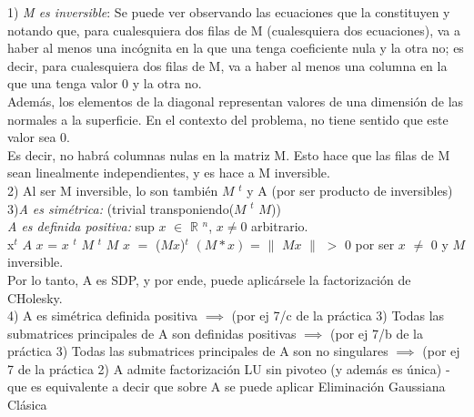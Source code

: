 1) \textit{M es inversible}: Se puede ver observando las ecuaciones que la constituyen y notando que, para cualesquiera dos filas de M (cualesquiera dos ecuaciones), va a haber al menos una incógnita en la que una tenga coeficiente nula y la otra no; es decir, para cualesquiera dos filas de M, va a haber al menos una columna en la que una tenga valor 0 y la otra no. \\
Además, los elementos de la diagonal representan valores de una dimensión de las normales a la superficie. En el contexto del problema, no tiene sentido que este valor sea 0.\\
Es decir, no habrá columnas nulas en la matriz M. Esto hace que las filas de M sean linealmente independientes, y es hace a M inversible.
\\

2) Al ser M inversible, lo son también $M$ $^{t}$ y A (por ser producto de inversibles)
\\

3)\textit{A es simétrica: } (trivial transponiendo($M$ $^{t}$ $M$))\\

\textit{A es definida positiva:} sup $x$ $\in$ $\mathbb{R}$ $^{n}$, $x \ne 0$ 
arbitrario. \\

x$^{t}$ $A$ $x$  = $x$ $^{t}$ $M$ $^{t}$ $M$ $ x$ $=$ ($Mx$)$^{t}$ 
 $(M*x)$ = $\|$ $Mx$ $\|$ $>$ $0$ por ser $x$ $\neq$ $0$ y $M$ 
inversible. \\

Por lo tanto, A es SDP, y por ende, puede aplicársele la factorización de CHolesky.
\\

4)
A es simétrica definida positiva $\implies$ (por ej 7/c de la práctica 3) Todas las submatrices principales de A son definidas positivas $\implies$ (por ej 7/b de la práctica 3) Todas las submatrices principales de A son no singulares $\implies$ (por ej 7 de la práctica 2)  A admite factorización LU sin pivoteo (y además es única) - que es equivalente a decir que sobre A se puede aplicar Eliminación Gaussiana Clásica
\\
